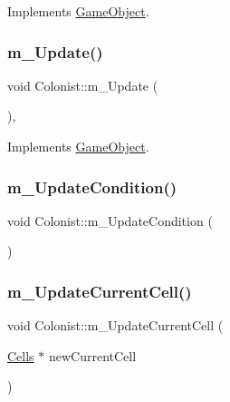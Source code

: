 Implements \mbox{\hyperlink{class_game_object_ad1f8ea8eb3673b1af8215bf92cdc0df8}{Game\+Object}}.

\mbox{\label{class_colonist_ad51f196ece25322b1ab2a229875ac490}} 
\subsubsection{\texorpdfstring{m\+\_\+\+Update()}{m\_Update()}}
{\footnotesize\ttfamily void Colonist\+::m\+\_\+\+Update (\begin{DoxyParamCaption}{ }\end{DoxyParamCaption})\hspace{0.3cm}{\ttfamily [override]}, {\ttfamily [virtual]}}



Implements \mbox{\hyperlink{class_game_object_a3af5a7b470e09f13a1422439fc6a9ba8}{Game\+Object}}.

\mbox{\label{class_colonist_a5d7f2fdfe8edfbac71c00bd3f80db78b}} 
\subsubsection{\texorpdfstring{m\+\_\+\+Update\+Condition()}{m\_UpdateCondition()}}
{\footnotesize\ttfamily void Colonist\+::m\+\_\+\+Update\+Condition (\begin{DoxyParamCaption}{ }\end{DoxyParamCaption})}

\mbox{\label{class_colonist_a8c57004821ec2f9fc070c2f173c413e5}} 
\subsubsection{\texorpdfstring{m\+\_\+\+Update\+Current\+Cell()}{m\_UpdateCurrentCell()}}
{\footnotesize\ttfamily void Colonist\+::m\+\_\+\+Update\+Current\+Cell (\begin{DoxyParamCaption}\item[{\mbox{\hyperlink{class_cells}{Cells}} $\ast$}]{new\+Current\+Cell }\end{DoxyParamCaption})}

